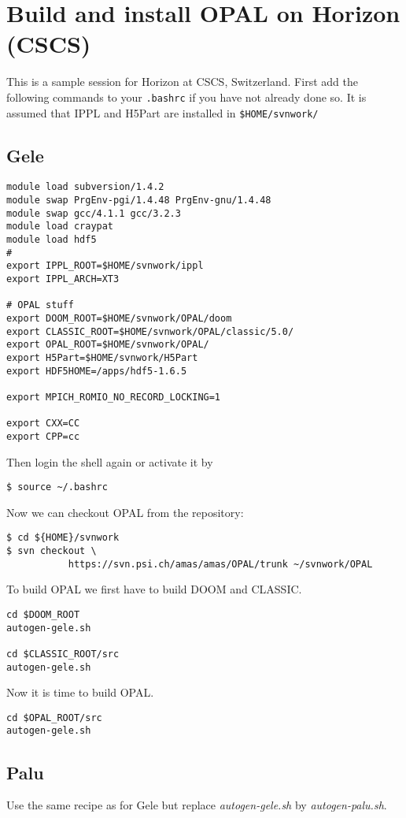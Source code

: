 \section{Build and install OPAL on Horizon (CSCS)}
This is a sample session for Horizon at CSCS, Switzerland. First add the following commands to your {\tt .bashrc} if
you have not already done so. It is assumed that IPPL and H5Part are installed in {\tt \${HOME}/svnwork/}

\subsection{Gele}

\begin{verbatim}
module load subversion/1.4.2
module swap PrgEnv-pgi/1.4.48 PrgEnv-gnu/1.4.48
module swap gcc/4.1.1 gcc/3.2.3
module load craypat
module load hdf5
#
export IPPL_ROOT=$HOME/svnwork/ippl
export IPPL_ARCH=XT3

# OPAL stuff
export DOOM_ROOT=$HOME/svnwork/OPAL/doom
export CLASSIC_ROOT=$HOME/svnwork/OPAL/classic/5.0/
export OPAL_ROOT=$HOME/svnwork/OPAL/
export H5Part=$HOME/svnwork/H5Part
export HDF5HOME=/apps/hdf5-1.6.5

export MPICH_ROMIO_NO_RECORD_LOCKING=1

export CXX=CC
export CPP=cc
\end{verbatim}

Then login the shell again or activate it by 
\begin{verbatim}
$ source ~/.bashrc
\end{verbatim}
Now we can checkout OPAL from the repository: 

\begin{verbatim}
$ cd ${HOME}/svnwork
$ svn checkout \
           https://svn.psi.ch/amas/amas/OPAL/trunk ~/svnwork/OPAL
\end{verbatim}
To build OPAL we first have to build DOOM and CLASSIC. 

\begin{verbatim}
cd $DOOM_ROOT
autogen-gele.sh

cd $CLASSIC_ROOT/src
autogen-gele.sh
\end{verbatim}
Now it is time to build OPAL.
\begin{verbatim}
cd $OPAL_ROOT/src
autogen-gele.sh
\end{verbatim}

\subsection{Palu}
Use the same recipe as for Gele but replace  {\em autogen-gele.sh} by {\em autogen-palu.sh}.

